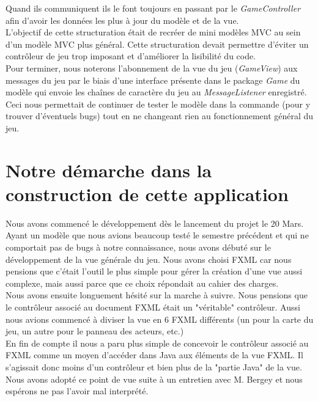 \documentclass[./standalone.tex]{subfiles}
\begin{document}
Quand ils communiquent ils le font toujours en passant par le \textit{GameController} afin d'avoir les données les plus à jour du modèle et de la vue.\\

L'objectif de cette structuration était de recréer de mini modèles MVC au sein d'un modèle MVC plus général. Cette structuration devait permettre d'éviter un contrôleur de jeu trop imposant et d'améliorer la lisibilité du code.\\

Pour terminer, nous noterons l'abonnement de la vue du jeu (\textit{GameView}) aux messages du jeu par le biais d'une interface présente dans le package \textit{Game} du modèle qui envoie les chaînes de caractère du jeu au \textit{MessageListener} enregistré. Ceci nous permettait de continuer de tester le modèle dans la commande (pour y trouver d'éventuels bugs) tout en ne changeant rien au fonctionnement général du jeu.
\newpage


\section{Notre démarche dans la construction de cette application}
\medskip

Nous avons commencé le développement dès le lancement du projet le 20 Mars. Ayant un modèle que nous avions beaucoup testé le semestre précédent et qui ne comportait pas de bugs à notre connaissance, nous avons débuté sur le développement de la vue générale du jeu. Nous avons choisi FXML car nous pensions que c'était l'outil le plus simple pour gérer la création d'une vue aussi complexe, mais aussi parce que ce choix répondait au cahier des charges.\\

Nous avons ensuite longuement hésité sur la marche à suivre. Nous pensions que le contrôleur associé au document FXML était un "véritable" contrôleur. Aussi nous avions commencé à diviser la vue en 6 FXML différents (un pour la carte du jeu, un autre pour le panneau des acteurs, etc.)\\

En fin de compte il nous a paru plus simple de concevoir le contrôleur associé au FXML comme un moyen d'accéder dans Java aux éléments de la vue FXML. Il s'agissait donc moins d'un contrôleur et bien plus de la "partie Java" de la vue. Nous avons adopté ce point de vue suite à un entretien avec M. Bergey et nous espérons ne pas l'avoir mal interprété.\\
\end{document}
